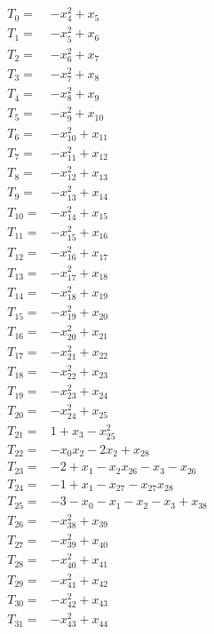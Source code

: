 \begingroup\small
\allowdisplaybreaks[4]
\setlength{\jot}{2pt}
\begin{align*}
T_{0}={}&-x_{4}^{2}+x_{5}\\[3pt]
T_{1}={}&-x_{5}^{2}+x_{6}\\[3pt]
T_{2}={}&-x_{6}^{2}+x_{7}\\[3pt]
T_{3}={}&-x_{7}^{2}+x_{8}\\[3pt]
T_{4}={}&-x_{8}^{2}+x_{9}\\[3pt]
T_{5}={}&-x_{9}^{2}+x_{10}\\[3pt]
T_{6}={}&-x_{10}^{2}+x_{11}\\[3pt]
T_{7}={}&-x_{11}^{2}+x_{12}\\[3pt]
T_{8}={}&-x_{12}^{2}+x_{13}\\[3pt]
T_{9}={}&-x_{13}^{2}+x_{14}\\[3pt]
T_{10}={}&-x_{14}^{2}+x_{15}\\[3pt]
T_{11}={}&-x_{15}^{2}+x_{16}\\[3pt]
T_{12}={}&-x_{16}^{2}+x_{17}\\[3pt]
T_{13}={}&-x_{17}^{2}+x_{18}\\[3pt]
T_{14}={}&-x_{18}^{2}+x_{19}\\[3pt]
T_{15}={}&-x_{19}^{2}+x_{20}\\[3pt]
T_{16}={}&-x_{20}^{2}+x_{21}\\[3pt]
T_{17}={}&-x_{21}^{2}+x_{22}\\[3pt]
T_{18}={}&-x_{22}^{2}+x_{23}\\[3pt]
T_{19}={}&-x_{23}^{2}+x_{24}\\[3pt]
T_{20}={}&-x_{24}^{2}+x_{25}\\[3pt]
T_{21}={}&1+x_{3}-x_{25}^{2}\\[3pt]
T_{22}={}&-x_{0}x_{2}-2x_{2}+x_{28}\\[3pt]
T_{23}={}&-2+x_{1}-x_{2}x_{26}-x_{3}-x_{26}\\[3pt]
T_{24}={}&-1+x_{1}-x_{27}-x_{27}x_{28}\\[3pt]
T_{25}={}&-3-x_{0}-x_{1}-x_{2}-x_{3}+x_{38}\\[3pt]
T_{26}={}&-x_{38}^{2}+x_{39}\\[3pt]
T_{27}={}&-x_{39}^{2}+x_{40}\\[3pt]
T_{28}={}&-x_{40}^{2}+x_{41}\\[3pt]
T_{29}={}&-x_{41}^{2}+x_{42}\\[3pt]
T_{30}={}&-x_{42}^{2}+x_{43}\\[3pt]
T_{31}={}&-x_{43}^{2}+x_{44}\\[3pt]

\end{align*}
